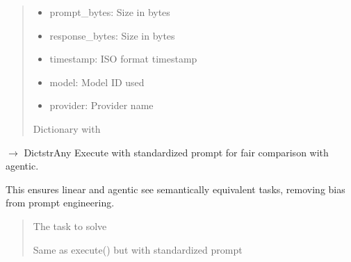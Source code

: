 \documentclass[letterpaper,10pt,english]{sphinxmanual}
\begin{document}
\begin{fulllineitems}
\begin{fulllineitems}
\begin{quote}
\begin{description}
\begin{itemize}
\item {} 
\sphinxAtStartPar
prompt\_bytes: Size in bytes

\item {} 
\sphinxAtStartPar
response\_bytes: Size in bytes

\item {} 
\sphinxAtStartPar
timestamp: ISO format timestamp

\item {} 
\sphinxAtStartPar
model: Model ID used

\item {} 
\sphinxAtStartPar
provider: Provider name

\end{itemize}


\sphinxAtStartPar
Dictionary with

\end{description}\end{quote}

\end{fulllineitems}


\begin{fulllineitems}
\label{\detokenize{core.execution:core.execution.LinearExecutor.execute_comparison}}
\pysigstartsignatures
\pysiglinewithargsret
{}
{}
{{ $\rightarrow$ Dict\DUrole{p}{{[}}strAny\DUrole{p}{{]}}}}
\pysigstopsignatures
\sphinxAtStartPar
Execute with standardized prompt for fair comparison with agentic.

\sphinxAtStartPar
This ensures linear and agentic see semantically equivalent tasks,
removing bias from prompt engineering.
\begin{quote}\begin{description}
\sphinxAtStartPar
{} \textendash{} The task to solve

\sphinxAtStartPar
Same as execute() but with standardized prompt

\end{description}\end{quote}

\end{fulllineitems}


\end{fulllineitems}
\end{document}
